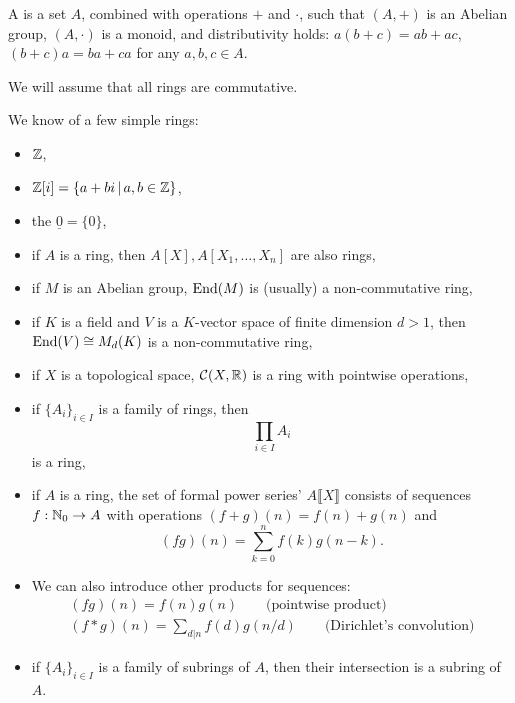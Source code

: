 

\begin{definition}
  A  is a set $A$, combined with operations $+$ and $\cdot$, such
  that $(A, +)$ is an Abelian group, $(A, \cdot)$ is a monoid, and
  distributivity holds: $a(b+c) = ab+ac$, $(b+c)a = ba+ca$ for any $a, b, c \in
  A$.
\end{definition}

\begin{remark}
  We will assume that all rings are commutative.
\end{remark}

\begin{example}
  We know of a few simple rings:
  \begin{itemize}
  \item $\mathbb{Z}$,
  \item $\mathbb{Z}[i] = \{a + bi \,|\, a, b \in \mathbb{Z}\}$,
  \item the  $\underline{0} = \{0\}$,
  \item if $A$ is a ring, then $A[X], A[X_1, \ldots, X_n]$ are also rings,
  \item if $M$ is an Abelian group, $\operatorname{End}(M)$ is (usually) a non-commutative
	ring,
  \item if $K$ is a field and $V$ is a $K$-vector space of finite dimension
	$d>1$, then $\operatorname{End}(V) \cong M_d(K)$ is a non-commutative ring,
  \item if $X$ is a topological space, $\mathcal{C}(X, \mathbb{R})$ is a ring with pointwise
	operations,
  \item if $\{A_i\}_{i \in I}$ is a family of rings, then
	\[
	  \prod_{i \in I} A_i
	\]
	is a ring,
  \item if $A$ is a ring, the set of formal power series' $A\llbracket X
	\rrbracket$ consists of sequences $f: \mathbb{N}_0 \to A$ with operations $(f+g)(n)
	= f(n) + g(n)$ and
	\[
	  (fg)(n) = \sum_{k=0}^n f(k) g(n-k).
	\]
  \item We can also introduce other products for sequences:
	\begin{gather*}
	  (fg)(n) = f(n) g(n) \qquad \text{(pointwise product)} \\
	  (f * g)(n) = \sum_{d | n} f(d) g(n / d) \qquad \text{(Dirichlet's
		convolution)}
	\end{gather*}
  \item if $\{A_i\}_{i \in I}$ is a family of subrings of $A$, then their
	intersection is a subring of $A$.
  \end{itemize}
\end{example}

